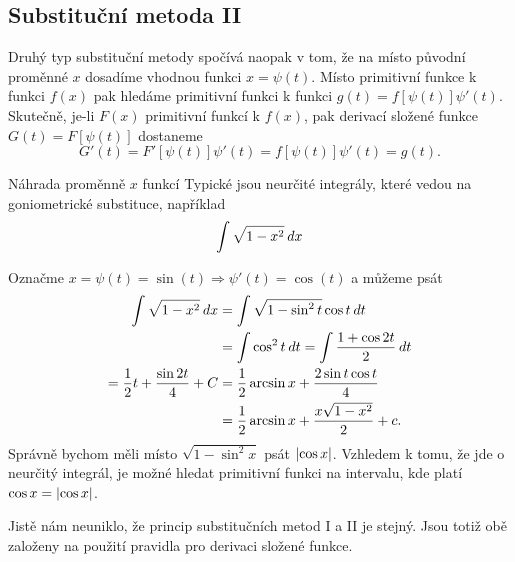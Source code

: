 {    %
    \subsection{Substituční metoda II}
      Druhý typ substituční metody spočívá naopak v tom, že na místo původní proměnné \(x\) 
      dosadíme vhodnou funkci \(x = \psi(t)\). Místo primitivní funkce k funkci \(f(x)\) pak 
      hledáme primitivní funkci k funkci \(g(t) = f[\psi(t)]\psi'(t)\). Skutečně, je-li \(F(x)\) 
      primitivní funkcí k \(f(x)\), pak derivací složené funkce \(G(t) = F[\psi(t)]\) dostaneme
      \begin{equation*}
       G'(t) = F'[\psi(t)]\psi'(t) = f[\psi(t)]\psi'(t) = g(t).
      \end{equation*}
      
      \begin{example} Náhrada proměnně \(x\) funkcí
        Typické jsou neurčité integrály, které vedou na goniometrické substituce, například
        \[\int\sqrt{1-x^2}\hspace{2pt}dx\]
        
        Označme \(x=\psi(t)=\sin(t)  \Rightarrow \psi'(t)=\cos(t)\) a můžeme psát
        \begin{align*}
          \int\sqrt{1-x^2}\hspace{2pt}dx 
            &= \int\sqrt{1-\sin^2t}\cos t\hspace{2pt}dt                      \\
            &= \int\cos^2 t \hspace{2pt}dt = \int\frac{1+\cos2t}{2}\hspace{2pt}dt    \\
          = \frac{1}{2}t+\frac{\sin2t}{4}+C
            &= \frac{1}{2}\arcsin x + \frac{2\sin t\cos t}{4}        \\
            &= \frac{1}{2}\arcsin x + \frac{x\sqrt{1-x^2}}{2} + c.
        \end{align*}
        Správně bychom měli místo \(\sqrt{1 - \sin^2x}\) psát \(\left\lvert\cos x\right\rvert\). Vzhledem k tomu, že 
        jde o neurčitý integrál, je možné hledat primitivní funkci na intervalu, kde platí \(\cos x 
        = \left\lvert\cos x\right\rvert\).
      \end{example}
      Jistě nám neuniklo, že princip substitučních metod I a II je stejný. Jsou totiž obě založeny 
      na použití pravidla pro derivaci složené funkce.
  
}
